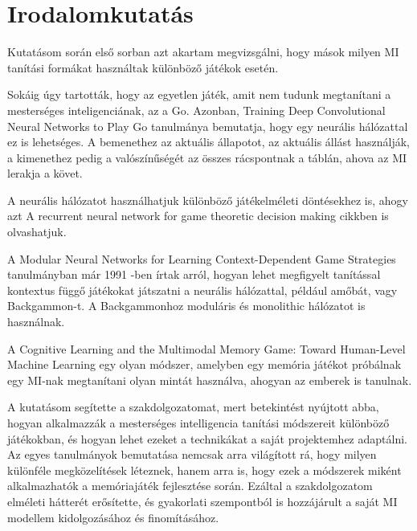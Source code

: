\chapter{Irodalomkutatás}

\thispagestyle{fancy}
\pagestyle{fancy}

Kutatásom során első sorban azt akartam megvizsgálni, hogy mások milyen MI tanítási formákat használtak különböző játékok esetén. 

Sokáig úgy tartották, hogy az egyetlen játék, amit nem tudunk megtanítani a mesterséges inteligenciának, az a Go. Azonban, Training Deep Convolutional Neural Networks to Play Go tanulmánya \cite{pmlr-v37-clark15} bemutatja,
 hogy egy neurális hálózattal ez is lehetséges. A bemenethez az aktuális állapotot, az aktuális állást használják, a kimenethez pedig a valószínűségét az összes rácspontnak a táblán, ahova az MI lerakja a követ. 

 A neurális hálózatot használhatjuk különböző játékelméleti döntésekhez is, ahogy azt A recurrent neural network for game theoretic decision making \cite{bhatia2014recurrent} cikkben is olvashatjuk. 

A Modular Neural Networks for Learning Context-Dependent Game Strategies \cite{boyan1992modular} tanulmányban már 1991 -ben írtak arról, hogyan lehet megfigyelt tanítással kontextus függő játékokat játszatni a neurális hálózattal, például amőbát, vagy Backgammon-t. A Backgammonhoz moduláris és monolithic hálózatot is használnak. 

A Cognitive Learning and the Multimodal Memory Game: Toward Human-Level Machine Learning \cite{4634261} egy olyan módszer, amelyben egy memória játékot próbálnak egy MI-nak megtanítani olyan mintát használva, ahogyan az emberek is tanulnak.

A kutatásom segítette a szakdolgozatomat, mert betekintést nyújtott abba, hogyan alkalmazzák a mesterséges intelligencia tanítási módszereit különböző játékokban, és hogyan lehet ezeket a technikákat a saját projektemhez adaptálni. Az egyes tanulmányok bemutatása nemcsak arra világított rá, hogy milyen különféle megközelítések léteznek, hanem arra is, hogy ezek a módszerek miként alkalmazhatók a memóriajáték fejlesztése során. Ezáltal a szakdolgozatom elméleti hátterét erősítette, és gyakorlati szempontból is hozzájárult a saját MI modellem kidolgozásához és finomításához.